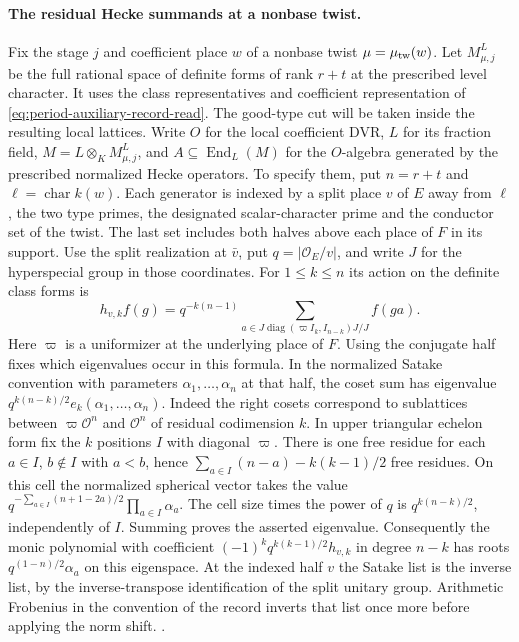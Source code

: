 \paragraph{The residual Hecke summands at a nonbase twist.}
%
Fix the stage \(j\) and coefficient place \(w\) of a nonbase twist
\(\mu=\mu_{\rm tw}(w)\). Let \(M^L_{\mu,j}\) be the full rational
space of definite forms of rank \(r+t\) at the prescribed level
character. It uses the class representatives and coefficient
representation of \eqref{eq:period-auxiliary-record-read}.
The good-type cut will be taken inside the resulting local lattices.
Write \(O\) for the local coefficient DVR, \(L\) for its fraction
field, \(M=L\otimes_K M^L_{\mu,j}\),
and \(A\subseteq\operatorname{End}_L(M)\) for the \(O\)-algebra
generated by the prescribed normalized Hecke operators. To specify
them, put \(n=r+t\) and \(\ell=\operatorname{char}k(w)\). Each
generator is indexed by a split place \(v\) of \(E\) away from
\(\ell\), the two type primes, the designated scalar-character
prime and the conductor set of the twist. The last set includes
both halves above each place of \(F\) in its support.
Use the split realization at \(\bar v\), put \(q=|\mathcal O_E/v|\),
and write \(J\) for the hyperspecial group in those coordinates.
For \(1\le k\le n\) its action on the definite class forms is
\begin{equation}
 \label{eq:record-normalized-hecke}
 h_{v,k}f(g)=q^{-k(n-1)}
    \sum_{a\in J\operatorname{diag}(\varpi I_k,I_{n-k})J/J}
                   f(ga).
\end{equation}
Here \(\varpi\) is a uniformizer at the underlying place of \(F\).
Using the conjugate half fixes which eigenvalues occur in this
formula. In the normalized Satake convention with parameters
\(\alpha_1,\ldots,\alpha_n\) at that half, the coset sum has
eigenvalue \(q^{k(n-k)/2}e_k(\alpha_1,\ldots,\alpha_n)\).
Indeed the right cosets correspond to sublattices between
\(\varpi\mathcal O^n\) and \(\mathcal O^n\) of residual codimension
\(k\). In upper triangular echelon form fix the \(k\) positions
\(I\) with diagonal \(\varpi\). There is one free residue for each
\(a\in I\), \(b\notin I\) with \(a<b\), hence
\(\sum_{a\in I}(n-a)-k(k-1)/2\) free residues. On this cell
the normalized spherical vector takes the value
\(q^{-\sum_{a\in I}(n+1-2a)/2}\prod_{a\in I}\alpha_a\).
The cell size times the power of \(q\) is \(q^{k(n-k)/2}\),
independently of \(I\). Summing proves the asserted eigenvalue.
Consequently the monic polynomial with coefficient
\((-1)^kq^{k(k-1)/2}h_{v,k}\) in degree \(n-k\) has roots
\(q^{(1-n)/2}\alpha_a\) on this eigenspace. At the indexed half
\(v\) the Satake list is the inverse list, by the inverse-transpose
identification of the split unitary group. Arithmetic Frobenius in
the convention of the record inverts that list once more before
applying the norm shift.
.

